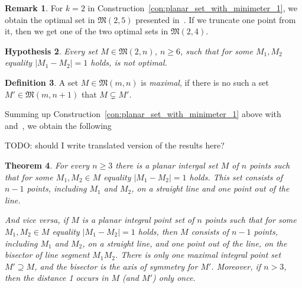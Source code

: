 \documentclass[a4paper,14pt]{article} %
\theoremstyle{plain}
\newtheorem{theorem}{Theorem}[section]
\newtheorem{hypothesis}[theorem]{Hypothesis}
\theoremstyle{definition}
\newtheorem{definition}[theorem]{Definition}
\newtheorem{remark}[theorem]{Remark}
\begin{document}
\begin{remark}
	For $k=2$ in Construction~\ref{con:planar_set_with_minimeter_1},
	we obtain the optimal set in $\mathfrak{M}(2,5)$ presented in~\cite[Fig. 1]{harborth1993upper}.
	If we truncate one point from it,
	then we get one of the two optimal sets in $\mathfrak{M}(2,4)$.
\end{remark}

\begin{hypothesis}
	Every set $M\in\mathfrak{M}(2,n)$, $n\geq 6$, such that for some $M_1,M_2$ equality $|M_1 - M_2|=1$ holds,
	is not optimal.
\end{hypothesis}

\begin{definition}
	\cite{antonov2008maximal}
	A set $M\in \mathfrak{M}(m,n)$ is \textit{maximal},
	if there is no such a set $M'\in \mathfrak{M}(m,n+1)$
	that $M \subsetneq M'$.
\end{definition}


Summing up Construction~\ref{con:planar_set_with_minimeter_1} above with~\cite[lemma 3 and proposition 6]{our-vmmsh-2018}
and~\cite[Section 6]{antonov2008maximal},
we obtain the following

TODO: should I write translated version of the results here?

\begin{theorem}
	\label{thm:minimeter_1_planar}
	For every $n\geq 3$ there is a planar intergal set $M$ of $n$ points
	such that for some $M_1,M_2 \in M$ equality $|M_1 - M_2|=1$ holds.
	This set consists of $n-1$ points, including $M_1$ and $M_2$, on a straight line and one point out of the line.

	And vice versa, if $M$ is a planar integral point set of $n$ points
	such that for some $M_1,M_2 \in M$ equality $|M_1 - M_2|=1$ holds,
	then $M$ consists of $n-1$ points, including $M_1$ and $M_2$, on a straight line,
	and one point out of the line, on the bisector of line segment $M_1 M_2$.
	There is only one maximal integral point set $M' \supseteq M$,
	and the bisector is the axis of symmetry for $M'$.
	Moreover, if $n > 3$, then the distance 1 occurs in $M$ (and $M'$) only once.
\end{theorem}
\end{document}
